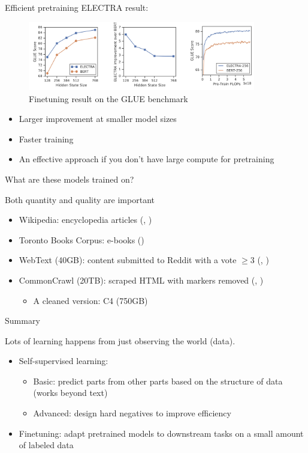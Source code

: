 \documentclass[usenames,dvipsnames,notes,11pt,aspectratio=169,hyperref={colorlinks=true, linkcolor=blue}]{beamer}
\begin{document}
\begin{frame}
    {Efficient pretraining}
    ELECTRA result:
    \begin{figure}
        \includegraphics[height=3cm]{figures/electra-result}
        \caption{Finetuning result on the GLUE benchmark}
    \end{figure}
    \begin{itemize}
        \item Larger improvement at smaller model sizes
        \item Faster training 
        \item An effective approach if you don't have large compute for pretraining
    \end{itemize}
\end{frame}

\begin{frame}
    {What are these models trained on?}

    Both quantity and quality are important
    \begin{itemize}
        \item Wikipedia: encyclopedia articles (, )
        \item Toronto Books Corpus: e-books () 
        \item WebText (40GB): content submitted to Reddit with a vote $\ge 3$ (, ) 
        \item CommonCrawl (20TB): scraped HTML with markers removed (, )
            \begin{itemize}
                \item A cleaned version: C4 (750GB)
            \end{itemize}
    \end{itemize}
\end{frame}

\begin{frame}
    {Summary}

    Lots of learning happens from just observing the world (data).
    \begin{itemize}
        \item Self-supervised learning: 
            \begin{itemize}
                \item Basic: predict parts from other parts based on the structure of data (works beyond text)
                \item Advanced: design hard negatives to improve efficiency
            \end{itemize}
        \item Finetuning: adapt pretrained models to downstream tasks on a small amount of labeled data
    \end{itemize}
\end{frame}
\end{document}
